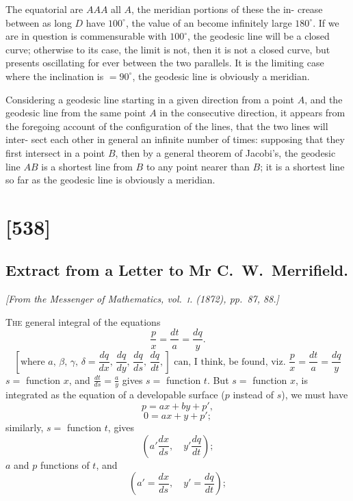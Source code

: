 \documentclass[11pt,a4paper]{book}
\begin{document}
The equatorial are $AAA$ all $A$, the meridian portions of these the in-
crease between as long $D$ have $100^\circ$, the value of an become infinitely large $180^\circ$.
If we are in question is commensurable with $100^\circ$, the geodesic line will be a closed curve;
otherwise to its case, the limit is not, then it is not a closed curve, but presents oscillating
for ever between the two parallels. It is the limiting case where the inclination is $= 90^\circ$,
the geodesic line is obviously a meridian.

Considering a geodesic line starting in a given direction from a point $A$, and
the geodesic line from the same point $A$ in the consecutive direction, it appears from
the foregoing account of the configuration of the lines, that the two lines will inter-
sect each other in general an infinite number of times: supposing that they first
intersect in a point $B$, then by a general theorem of Jacobi's, the geodesic line $AB$
is a shortest line from $B$ to any point nearer than $B$; it is a shortest line so far as
the geodesic line is obviously a meridian.

\clearpage
\clearpage


\section{[538]}
\subsection{Extract from a Letter to Mr C.~W.~Merrifield.}

\begin{center}
\textit{[From the Messenger of Mathematics, vol.~\textsc{i}. (1872), pp.~87, 88.]}
\end{center}

\textsc{The} general integral of the equations
\[
\frac{p}{x} = \frac{dt}{a} = \frac{dq}{y}.
\]
\[
\left[ \text{where } a, \, \beta, \, \gamma, \, \delta = \frac{dq}{dx}, \, \frac{dq}{dy}, \, \frac{dq}{ds}, \, \frac{dq}{dt}, \right] \text{ can, I think, be found, viz.\ } \frac{p}{x} = \frac{dt}{a} = \frac{dq}{y}
\]
$s =$ function $x$, and $\frac{dt}{ds} = \frac{a}{y}$ gives $s =$ function $t$. But $s =$ function $x$, is integrated as the equation of a developable surface ($p$ instead of $s$), we must have
\[
p = ax + by + p',
\]
\[
0 = ax + y + p';
\]
similarly, $s =$ function $t$, gives
\[
\left( a' \frac{dx}{ds}, \quad y' \frac{dq}{dt} \right);
\]
$a$ and $p$ functions of $t$, and
\[
\left( a' = \frac{dx}{ds}, \quad y' = \frac{dq}{dt} \right);
\]
\end{document}
